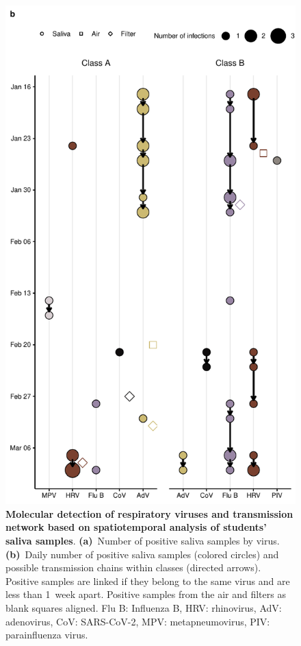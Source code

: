 \documentclass[fleqn,11pt]{wlscirep}
\begin{document}
\begin{figure}[!htpb]
    \includegraphics{../../results/mol-data/network-plot.pdf}
    \caption{\textbf{Molecular detection of respiratory viruses and transmission network based on spatiotemporal analysis of students' saliva samples}. \textbf{(a)}~Number of positive saliva samples by virus. \textbf{(b)}~Daily number of positive saliva samples (colored circles) and possible transmission chains within classes (directed arrows). Positive samples are linked if they belong to the same virus and are less than 1~week apart. Positive samples from the air and filters as blank squares aligned. Flu B: Influenza B, HRV: rhinovirus, AdV: adenovirus, CoV: SARS-CoV-2, MPV: metapneumovirus, PIV: parainfluenza virus.}
    \label{fig:molecular-descriptives}
\end{figure}
\end{document}

